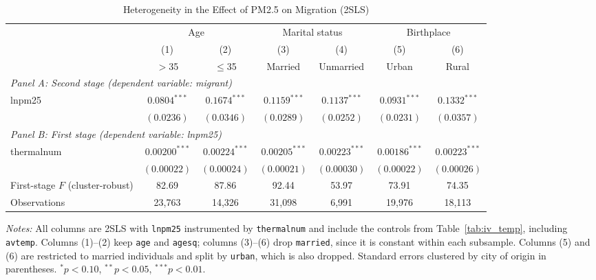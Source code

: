 \documentclass[11pt,twocolumn]{article}
\begin{document}
\begin{table}[!t]
\centering
\begin{threeparttable}
\caption{Heterogeneity in the Effect of PM2.5 on Migration (2SLS)}
\label{tab:het}
\small
\setlength{\tabcolsep}{4pt}
\begin{tabular}{lcccccc}
\toprule
 & \multicolumn{2}{c}{Age} & \multicolumn{2}{c}{Marital status} & \multicolumn{2}{c}{Birthplace} \\
\cmidrule(lr){2-3}\cmidrule(lr){4-5}\cmidrule(lr){6-7}
 & (1) & (2) & (3) & (4) & (5) & (6) \\
 & $>$35 & $\le$35 & Married & Unmarried & Urban & Rural \\
\midrule
\multicolumn{7}{l}{\textit{Panel A: Second stage (dependent variable: migrant)}} \\
lnpm25 & $0.0804^{***}$ & $0.1674^{***}$ & $0.1159^{***}$ & $0.1137^{***}$ & $0.0931^{***}$ & $0.1332^{***}$ \\
 & $(0.0236)$ & $(0.0346)$ & $(0.0289)$ & $(0.0252)$ & $(0.0231)$ & $(0.0357)$ \\
\midrule
\multicolumn{7}{l}{\textit{Panel B: First stage (dependent variable: lnpm25)}} \\
thermalnum & $0.00200^{***}$ & $0.00224^{***}$ & $0.00205^{***}$ & $0.00223^{***}$ & $0.00186^{***}$ & $0.00223^{***}$ \\
 & $(0.00022)$ & $(0.00024)$ & $(0.00021)$ & $(0.00030)$ & $(0.00022)$ & $(0.00026)$ \\
First-stage $F$ (cluster-robust) & 82.69 & 87.86 & 92.44 & 53.97 & 73.91 & 74.35 \\
\midrule
Observations & 23,763 & 14,326 & 31,098 & 6,991 & 19,976 & 18,113 \\
\bottomrule
\end{tabular}
\begin{tablenotes}\footnotesize
\item \textit{Notes:} All columns are 2SLS with \texttt{lnpm25} instrumented by \texttt{thermalnum} and include the controls from Table~\ref{tab:iv_temp}, including \texttt{avtemp}. Columns (1)--(2) keep \texttt{age} and \texttt{agesq}; columns (3)--(6) drop \texttt{married}, since it is constant within each subsample. Columns (5) and (6) are restricted to married individuals and split by \texttt{urban}, which is also dropped. Standard errors clustered by city of origin in parentheses. $^{*}p<0.10$, $^{**}p<0.05$, $^{***}p<0.01$.
\end{tablenotes}
\end{threeparttable}
\end{table}
\end{document}
